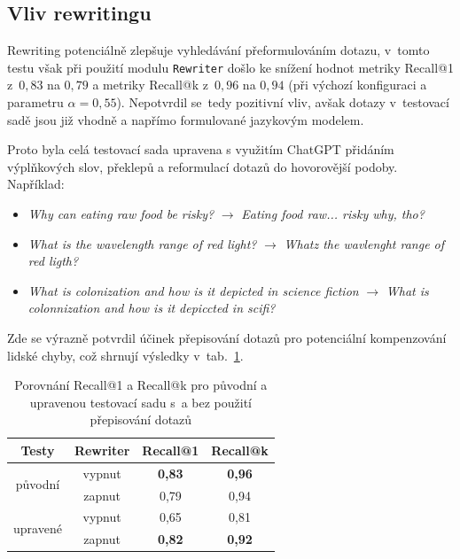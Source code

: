 \subsection{Vliv rewritingu}
Rewriting potenciálně zlepšuje vyhledávání přeformulováním dotazu, v~tomto testu však při použití modulu \texttt{Rewriter} došlo ke snížení hodnot metriky Recall@1 z~$0{,}83$ na $0{,}79$ a metriky Recall@k z~$0{,}96$ na $0{,}94$ (při výchozí konfiguraci a parametru $\alpha=0{,}55$). Nepotvrdil se~tedy pozitivní vliv, avšak dotazy v~testovací sadě jsou již vhodně a napřímo formulované jazykovým modelem. 


Proto byla celá testovací sada upravena s využitím ChatGPT přidáním výplňkových slov, překlepů a reformulací dotazů do hovorovější podoby. Například:

\begin{itemize}
    \item \textit{Why can eating raw food be risky?} $\rightarrow$ \textit{Eating food raw... risky why, tho?}
    \item \textit{What is the wavelength range of red light?} $\rightarrow$ \textit{Whatz the wavlenght range of red ligth?}
    \item \textit{What is colonization and how is it depicted in science fiction} $\rightarrow$ \textit{What is colonnization and how is it depiccted in scifi?}
\end{itemize}

\noindent Zde se výrazně potvrdil účinek přepisování dotazů pro potenciální kompenzování lidské chyby, což shrnují výsledky v~tab.~\ref{tab:rewriting_metrics_v2}.

\begin{table}[H]
    \centering
    \label{tab:rewriting_metrics_v2}
    \renewcommand{\arraystretch}{1.2}
    \begin{tabular}{|c|c|c|c|}
        \hline
        \textbf{Testy} & \textbf{Rewriter} & \textbf{Recall@1} & \textbf{Recall@k} \\
        \hline
        \multirow{2}{*}{původní}
        & vypnut & \textbf{0{,}83} & \textbf{0{,}96} \\
        & zapnut  & 0{,}79 & 0{,}94 \\
        \hline
        \multirow{2}{*}{upravené}
        & vypnut & 0{,}65 & 0{,}81 \\
        & zapnut  & \textbf{0{,}82} & \textbf{0{,}92} \\
        \hline
    \end{tabular}
    \caption{Porovnání Recall@1 a Recall@k pro původní a upravenou testovací sadu s~a bez použití přepisování dotazů}
\end{table}

